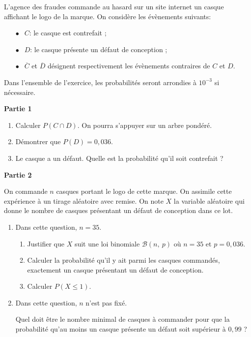\documentclass[10pt,a4paper]{article}
\begin{document}
L'agence des fraudes commande au hasard sur un site internet un casque affichant le logo de la marque. On considère les évènements suivants:

\setlength\parindent{10mm}
\begin{itemize}
\item[$\bullet~~$] $C$: \og le casque est contrefait \fg{} ;
\item[$\bullet~~$] $D$: \og le casque présente un défaut de conception \fg{} ;
\item[$\bullet~~$] $\overline{C}$ et $\overline{D}$ désignent respectivement les évènements contraires de $C$ et $D$.
\end{itemize}
\setlength\parindent{0mm}

Dans l'ensemble de l'exercice, les probabilités seront arrondies à $10^{-3}$ si nécessaire.

\bigskip

\textbf{Partie 1}

\medskip

\begin{enumerate}
\item Calculer $P(C \cap D)$. On pourra s'appuyer sur un arbre pondéré.
\item Démontrer que $P(D) = 0,036$.
\item Le casque a un défaut. Quelle est la probabilité qu'il soit contrefait ?
\end{enumerate}

\bigskip

\textbf{Partie 2}

\medskip

On commande $n$ casques portant le logo de cette marque. On assimile cette expérience à
un tirage aléatoire avec remise. On note $X$ la variable aléatoire qui donne le nombre de casques présentant un défaut de conception dans ce lot.

\medskip

\begin{enumerate}
\item Dans cette question, $n = 35$.
	\begin{enumerate}
		\item Justifier que $X$ suit une loi binomiale $\mathcal{B}(n,~p)$ où $n = 35$ et $p = 0,036$.
		\item Calculer la probabilité qu'il y ait parmi les casques commandés, exactement un casque présentant un défaut de conception.
		\item Calculer $P(X \leqslant 1)$.
	\end{enumerate}	
\item Dans cette question, $n$ n'est pas fixé.

Quel doit être le nombre minimal de casques à commander pour que la probabilité 
 qu'au moins un casque présente un défaut soit supérieur à $0,99$ ?
\end{enumerate}
\end{document}
